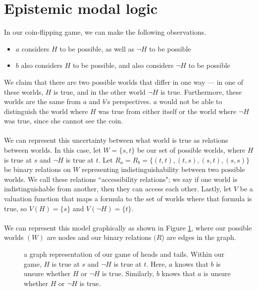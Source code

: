 \section{Epistemic modal logic}\label{survey_epistemic_modal_logic}
In our coin-flipping game, we can make the following observations.
\begin{itemize}
	\item $a$ considers $H$ to be possible, as well as $\neg H$ to be possible
	\item $b$ also considers $H$ to be possible, and also considers $\neg H$ to be possible
\end{itemize}
We claim that there are two possible worlds that differ in one way ---
in one of these worlds, $H$ is true, and in the other world $\neg H$ is true.
Furthermore, these worlds are the same from $a$ and $b$'s perspectives.
$a$ would not be able to distinguish the world where $H$ was true from either
itself or the world where $\neg H$ was true, since she cannot
see the coin.\\
\\
We can represent this uncertainty between what world is true as relations
between worlds.
In this case, let $W = \{ s, t\}$ be our set of possible worlds, where $H$ is true
at $s$ and $\neg H$ is true at $t$.
Let $R_a = R_b = \{(t,t), (t,s), (s, t), (s,s)\}$ be
binary relations on $W$ representing indistinguishability between two possible
worlds.
We call these relations ``accessibility relations"; we say if one world is
indistinguishable from another, then they can access each other.
Lastly, let $V$ be a valuation function that maps a formula to the set of worlds
where that formula is true, so $V(H) = \{s\}$ and $V(\neg H) = \{t\}$.\\
\\
We can represent this model graphically as shown in Figure \ref{htkripkefigure},
where our possible worlds $(W)$ are nodes and our binary relations $(R$) are edges in the
graph.

\begin{figure}[ht!]
\centering
{}
\caption[Possible worlds game of heads and tails.]{a graph representation of our game of heads and
tails. Within our game, $H$ is true at $s$ and $\neg H$ is true at $t$. Here, $a$ knows that $b$
is unsure whether $H$ or $\neg H$ is true. Similarly, $b$ knows that $a$ is unsure whether $H$ or
$\neg H$ is true.}\label{htkripkefigure}
\end{figure}

